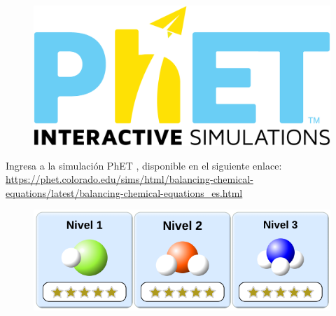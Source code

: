 \begin{opening}
    {
    \vspace{-0.7cm}
    \begin{figure}[H]
        \centering
        \includegraphics[width=.12\linewidth]{../images/phet}
    \end{figure}
    Ingresa a la simulación PhET , disponible en el siguiente enlace: \\
    {
    \scriptsize
    \url{https://phet.colorado.edu/sims/html/balancing-chemical-equations/latest/balancing-chemical-equations_es.html}
    }
    \begin{center}





        \begin{figure}[H]
            \centering
            \includegraphics[width=0.8\linewidth]{../images/20230415122710}
        \end{figure}

    \end{center}
    }
\end{opening}